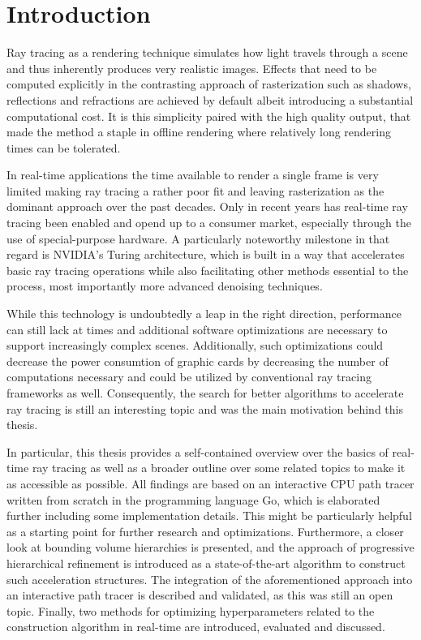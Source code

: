 \section{Introduction}
Ray tracing as a rendering technique simulates how light travels through a scene and thus inherently produces very realistic images. Effects that need to be computed explicitly in the contrasting approach of rasterization such as shadows, reflections and refractions are achieved by default albeit introducing a substantial computational cost. It is this simplicity paired with the high quality output, that made the method a staple in offline rendering where relatively long rendering times can be tolerated.

In real-time applications the time available to render a single frame is very limited making ray tracing a rather poor fit and leaving rasterization as the dominant approach over the past decades. Only in recent years has real-time ray tracing been enabled and opend up to a consumer market, especially through the use of special-purpose hardware. A particularly noteworthy milestone in that regard is NVIDIA's Turing architecture\cite{nvidia2017turing}, which is built in a way that accelerates basic ray tracing operations while also facilitating other methods essential to the process, most importantly more advanced denoising techniques. 

While this technology is undoubtedly a leap in the right direction, performance can still lack at times and additional software optimizations are necessary to support increasingly complex scenes. Additionally, such optimizations could decrease the power consumtion of graphic cards by decreasing the number of computations necessary and could be utilized by conventional ray tracing frameworks as well. Consequently, the search for better algorithms to accelerate ray tracing is still an interesting topic and was the main motivation behind this thesis. 

In particular, this thesis provides a self-contained overview over the basics of real-time ray tracing as well as a broader outline over some related topics to make it as accessible as possible. All findings are based on an interactive CPU path tracer written from scratch in the programming language Go, which is elaborated further including some implementation details. This might be particularly helpful as a starting point for further research and optimizations. Furthermore, a closer look at bounding volume hierarchies is presented, and the approach of progressive hierarchical refinement\cite{hendrich_parallel_2017} is introduced as a state-of-the-art algorithm to construct such acceleration structures. The integration of the aforementioned approach into an interactive path tracer is described and validated, as this was still an open topic. Finally, two methods for optimizing hyperparameters related to the construction algorithm in real-time are introduced, evaluated and discussed.